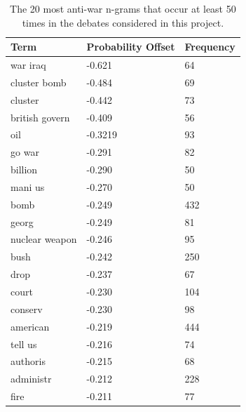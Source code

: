 \documentclass[12pt,a4paper,twoside,openright]{report}
\begin{document}
\begin{table}[]
	\centering
	\begin{tabular}{lll}
		\hline
		\textbf{Term}  & \textbf{Probability Offset} & \textbf{Frequency} \\ \hline
		war iraq&-0.621&64\\
		cluster bomb&-0.484&69\\
		cluster&-0.442&73\\
		british govern&-0.409&56\\
		oil&-0.3219&93\\
		go war&-0.291&82\\
		billion&-0.290&50\\
		mani us&-0.270&50\\
		bomb&-0.249&432\\
		georg&-0.249&81\\
		nuclear weapon&-0.246&95\\
		bush&-0.242&250\\
		drop&-0.237&67\\
		court&-0.230&104\\
		conserv&-0.230&98\\
		american&-0.219&444\\
		tell us&-0.216&74\\
		authoris&-0.215&68\\
		administr&-0.212&228\\
		fire&-0.211&77\\ \hline
	\end{tabular}
	\caption{The 20 most anti-war n-grams that occur at least 50 times in the debates considered in this project.}
	\label{table:anti-grams}
\end{table}
\end{document}
